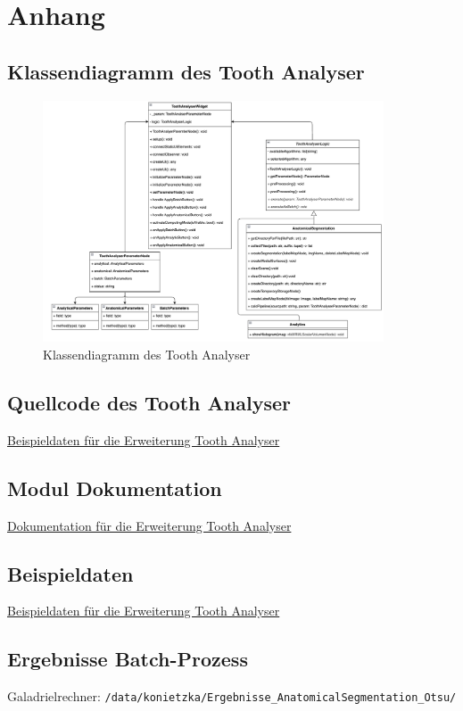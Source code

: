 \chapter{Anhang}
\label{chap:anhang}

\section{Klassendiagramm des Tooth Analyser}
\begin{figure}[h]
	\centering
	\includegraphics[width=0.9\textwidth, angle=90]{img/toothAnalyserClasses.png}
	\caption{Klassendiagramm des Tooth Analyser}
	\label{fig:klassendiagramm_gesamt}
\end{figure}

\section{Quellcode des Tooth Analyser}
\href{https://github.com/lukaskonietzka/SlicerToothAnalyser/blob/main/ToothAnalyser/ToothAnalyser.py}{Beispieldaten
für die Erweiterung Tooth Analyser}

\section{Modul Dokumentation}
\href{https://github.com/lukaskonietzka/SlicerToothAnalyser/tree/main}{Dokumentation
für die Erweiterung Tooth Analyser}

\section{Beispieldaten}
\href{https://github.com/lukaskonietzka/ToothAnalyserSampleData}{Beispieldaten
für die Erweiterung Tooth Analyser}

\section{Ergebnisse Batch-Prozess}
Galadrielrechner: \texttt{/data/konietzka/Ergebnisse\_AnatomicalSegmentation\_Otsu/}


